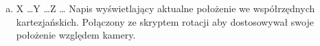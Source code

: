 \documentclass[10pt, a4paper]{article}
\begin{document}
\begin{enumerate}[I.]
\begin{enumerate}[a)]
				\item X \dots Y \dots Z \dots
				\newline	
				Napis wyświetlający aktualne położenie we współrzędnych kartezjańskich. Połączony ze skryptem rotacji aby dostosowywał swoje położenie względem kamery.
			\end{enumerate}
		\end{enumerate}
			
		
			
		
\end{document}
